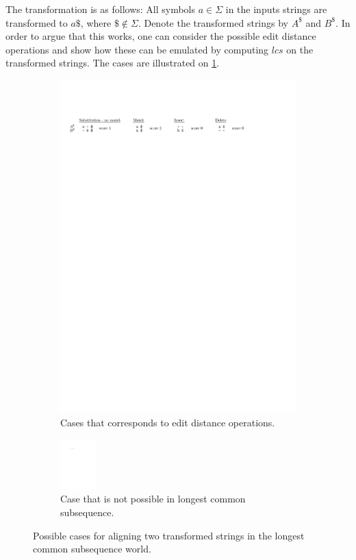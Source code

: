 \documentclass[twoside,11pt,openright]{report}
\begin{document}
The transformation is as follows: All symbols $a \in \Sigma$ in the inputs strings are transformed to $a\$$, where $\$ \not\in \Sigma$. Denote the transformed strings by $A^{\$}$ and $B^{\$}$. In order to argue that this works, one can consider the possible edit distance operations and show how these can be emulated by computing $lcs$ on the transformed strings. The cases are illustrated on \cref{fig:blow-up:edit-dist-cases}.
%
\begin{figure}[h!]
  \centering
  \begin{subfigure}{0.8\textwidth}
    \includegraphics[width=\textwidth]{images/blow-up-edit-dist-cases}
    \caption{Cases that corresponds to edit distance operations.}
    \label{fig:blow-up:edit-dist-cases}
  \end{subfigure}
  \begin{subfigure}{0.8\textwidth}
    \centering
    \includegraphics[width=0.15\textwidth]{images/blow-up-not-possible-case}
    \caption{Case that is not possible in longest common subsequence.}
    \label{fig:blow-up:not-possible}
  \end{subfigure}
  \caption{Possible cases for aligning two transformed strings in the longest common subsequence world.}
\end{figure}%
\end{document}
